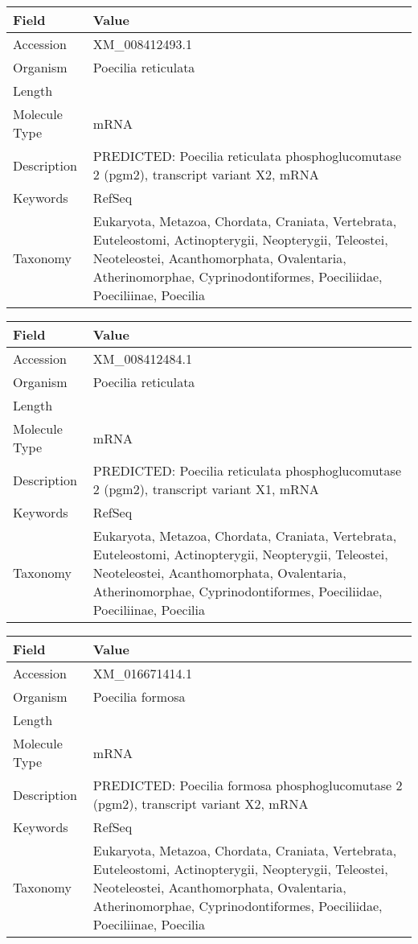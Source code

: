 \documentclass[10pt]{article}
\begin{document}
\vspace{1em}
{\footnotesize
\begin{longtable}{>{\raggedright\arraybackslash}p{4.5cm} >{\raggedright\arraybackslash}p{11.5cm}}
\textbf{Field} & \textbf{Value} \\
\hline
Accession & XM\_008412493.1 \\
Organism & Poecilia reticulata \\
Length & 3752 \\
Molecule Type & mRNA \\
Description & PREDICTED: Poecilia reticulata phosphoglucomutase 2 (pgm2), transcript variant X2, mRNA \\
Keywords & RefSeq \\
Taxonomy & Eukaryota, Metazoa, Chordata, Craniata, Vertebrata, Euteleostomi, Actinopterygii, Neopterygii, Teleostei, Neoteleostei, Acanthomorphata, Ovalentaria, Atherinomorphae, Cyprinodontiformes, Poeciliidae, Poeciliinae, Poecilia \\
\end{longtable}
}

\vspace{1em}
{\footnotesize
\begin{longtable}{>{\raggedright\arraybackslash}p{4.5cm} >{\raggedright\arraybackslash}p{11.5cm}}
\textbf{Field} & \textbf{Value} \\
\hline
Accession & XM\_008412484.1 \\
Organism & Poecilia reticulata \\
Length & 4154 \\
Molecule Type & mRNA \\
Description & PREDICTED: Poecilia reticulata phosphoglucomutase 2 (pgm2), transcript variant X1, mRNA \\
Keywords & RefSeq \\
Taxonomy & Eukaryota, Metazoa, Chordata, Craniata, Vertebrata, Euteleostomi, Actinopterygii, Neopterygii, Teleostei, Neoteleostei, Acanthomorphata, Ovalentaria, Atherinomorphae, Cyprinodontiformes, Poeciliidae, Poeciliinae, Poecilia \\
\end{longtable}
}

\vspace{1em}
{\footnotesize
\begin{longtable}{>{\raggedright\arraybackslash}p{4.5cm} >{\raggedright\arraybackslash}p{11.5cm}}
\textbf{Field} & \textbf{Value} \\
\hline
Accession & XM\_016671414.1 \\
Organism & Poecilia formosa \\
Length & 3750 \\
Molecule Type & mRNA \\
Description & PREDICTED: Poecilia formosa phosphoglucomutase 2 (pgm2), transcript variant X2, mRNA \\
Keywords & RefSeq \\
Taxonomy & Eukaryota, Metazoa, Chordata, Craniata, Vertebrata, Euteleostomi, Actinopterygii, Neopterygii, Teleostei, Neoteleostei, Acanthomorphata, Ovalentaria, Atherinomorphae, Cyprinodontiformes, Poeciliidae, Poeciliinae, Poecilia \\
\end{longtable}
}
\end{document}
